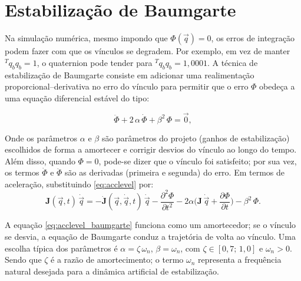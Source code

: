 \section{Estabilização de Baumgarte}
Na simulação numérica, mesmo impondo que $\Phi(\vec q) = 0$, os erros de integração podem fazer com que os vínculos se degradem. 
Por exemplo, em vez de manter
${}^T q_b q_b = 1$,
o quaternion pode tender para ${}^T q_b q_b = 1,0001$.
A técnica de estabilização de Baumgarte consiste em adicionar uma realimentação proporcional--derivativa no erro do vínculo para permitir que o erro $\Phi$ obedeça a uma equação diferencial estável do tipo:

\begin{equation}
\ddot{\Phi}
+2\,\alpha\,\dot{\Phi}
+\beta^2\,\Phi
=\vec 0,
\label{eq:Baumgarte}
\end{equation}

Onde os parâmetros $\alpha$ e $\beta$ são parâmetros do projeto (ganhos de estabilização) escolhidos de forma a amortecer e corrigir desvios do vínculo ao longo do tempo.
Além disso, quando $\Phi = 0$, pode-se dizer que o vínculo foi satisfeito;
por sua vez, os termos
$\dot \Phi$ e $\ddot \Phi$
são as derivadas (primeira e segunda) do erro.
Em termos de aceleração, substituindo \eqref{eq:acclevel} por:
\begin{equation}
\mathbf{J}(\vec q,t)\,\dot{\vec q}
=
-\dot{\mathbf{J}}(\vec q,\dot{\vec q},t)\,\dot{\vec q}
-\frac{\partial^2 \Phi}{\partial t^2}
-2\alpha\Big(\mathbf{J}\,\dot{\vec q}
+\frac{\partial \Phi}{\partial t}\Big)
-\beta^2\,\Phi.
\label{eq:acclevel_baumgarte}
\end{equation}

A equação \eqref{eq:acclevel_baumgarte} funciona como um amortecedor; se o vínculo se desvia, a equação de Baumgarte conduz a trajetória de volta ao vínculo.
Uma escolha típica dos parâmetros é
$\alpha=\zeta\,\omega_n$,
$\beta=\omega_n$, com
$\zeta\in[0{,}7;\,1{,}0]$ e
$\omega_n>0$.
Sendo que $\zeta$ é a razão de amortecimento;
o termo $\omega_n$ representa a frequência natural desejada para a dinâmica artificial de estabilização.

